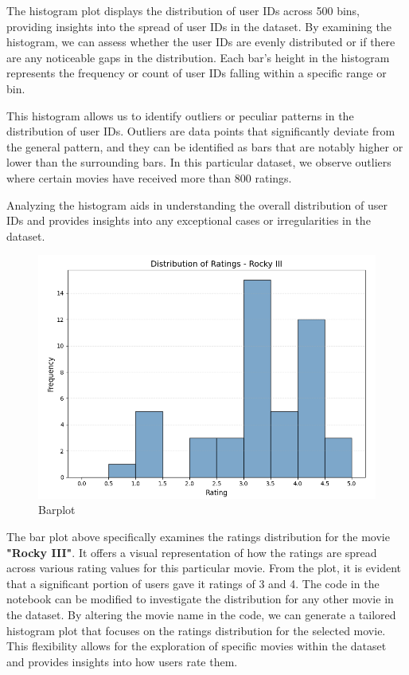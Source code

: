 \documentclass{article}
\begin{document}
\vspace{0.3cm}

The histogram plot displays the distribution of user IDs across 500 bins, providing insights into the spread of user IDs in the dataset. By examining the histogram, we can assess whether the user IDs are evenly distributed or if there are any noticeable gaps in the distribution. Each bar's height in the histogram represents the frequency or count of user IDs falling within a specific range or bin.

This histogram allows us to identify outliers or peculiar patterns in the distribution of user IDs. Outliers are data points that significantly deviate from the general pattern, and they can be identified as bars that are notably higher or lower than the surrounding bars. In this particular dataset, we observe outliers where certain movies have received more than 800 ratings.

Analyzing the histogram aids in understanding the overall distribution of user IDs and provides insights into any exceptional cases or irregularities in the dataset.

\begin{figure}[H]
  \centering
  \includegraphics[width=.9\textwidth]{image/barplot.png}
  \caption{Barplot}
\end{figure}

The bar plot above specifically examines the ratings distribution for the movie \textbf{"Rocky III"}. It offers a visual representation of how the ratings are spread across various rating values for this particular movie. From the plot, it is evident that a significant portion of users gave it ratings of 3 and 4. The code in the notebook can be modified to investigate the distribution for any other movie in the dataset. By altering the movie name in the code, we can generate a tailored histogram plot that focuses on the ratings distribution for the selected movie. This flexibility allows for the exploration of specific movies within the dataset and provides insights into how users rate them.
\end{document}
